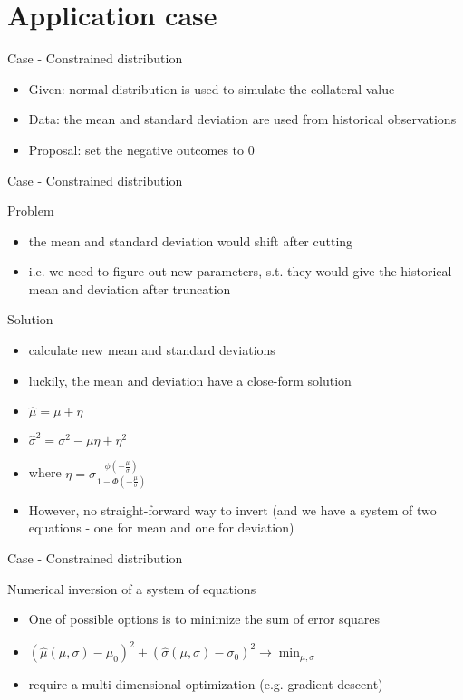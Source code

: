 \documentclass[presentation]{beamer}
\begin{document}
\section{Application case}
\label{sec-4}
\begin{frame}[label=sec-4-1]{Case - Constrained distribution}
\begin{itemize}
\item Given: normal distribution is used to simulate the collateral value
\item Data: the mean and standard deviation are used from historical observations
\item Proposal: set the negative outcomes to 0
\end{itemize}
\end{frame}
\begin{frame}[label=sec-4-2]{Case - Constrained distribution}
\begin{block}{Problem}
\begin{itemize}
\item the mean and standard deviation would shift after cutting
\item i.e. we need to figure out new parameters, s.t. they would give the historical mean and deviation after truncation
\end{itemize}
\end{block}
\begin{block}{Solution}
\begin{itemize}
\item calculate new mean and standard deviations
\item luckily, the mean and deviation have a close-form solution
\item $\hat{\mu} = \mu + \eta$
\item $\hat{\sigma}^2 = \sigma^2 - \mu\eta + \eta^2$
\item where $\eta = \sigma \frac{\phi(-\frac{\mu}{\sigma})}{1 - \Phi(-\frac{\mu}{\sigma})}$
\item However, no straight-forward way to invert (and we have a system of two equations - one for mean and one for deviation)
\end{itemize}
\end{block}
\end{frame}
\begin{frame}[label=sec-4-3]{Case - Constrained distribution}
\begin{block}{Numerical inversion of a system of equations}
\begin{itemize}
\item One of possible options is to minimize the sum of error squares
\item $(\hat{\mu}(\mu,\sigma) - \mu_0)^2 + (\hat{\sigma}(\mu,\sigma) - \sigma_0)^2 \rightarrow \min_{\mu,\sigma}$
\item require a multi-dimensional optimization (e.g. gradient descent)
\end{itemize}
\end{block}
\end{frame}
\end{document}
